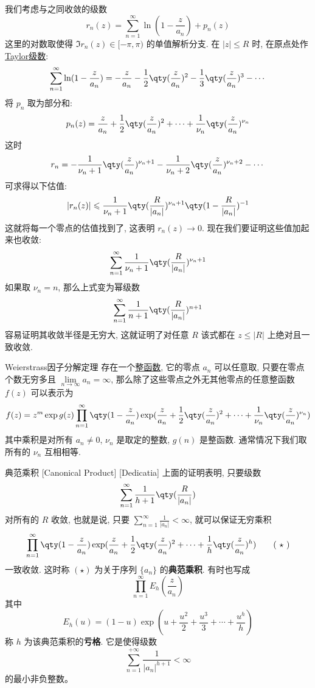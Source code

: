 \documentclass[UTF8]{ctexart}
\begin{document}
        \begin{prf}
            我们考虑与之同收敛的级数
            \[r_n(z)=\sum_{n=1}^{\infty}\ln(1-\frac{z}{a_n})+p_n(z)\]
            这里的对数取使得 \(\Im r_n(z)\in[-\pi,\pi)\) 的单值解析分支. 在 \(|z|\leqslant R\) 时, 在原点处作\hyperref[thm:TaylorSeries]{Taylor级数}:
            \[\sum_{n=1}^{\infty}\ln(1-\frac{z}{a_n})=-\frac{z}{a_n}-\frac{1}{2}\qty(\frac{z}{a_n})^2-\frac{1}{3}\qty(\frac{z}{a_n})^3-\cdots\]
            将 \(p_n\) 取为部分和: 
            \[p_n(z)=\frac{z}{a_n}+\frac{1}{2}\qty(\frac{z}{a_n})^2+\cdots+\frac{1}{\nu_n}\qty(\frac{z}{a_n})^{\nu_n}\]
            这时
            \[r_n=-\frac{1}{\nu_n+1}\qty(\frac{z}{a_n})^{\nu_n+1}-\frac{1}{\nu_n+2}\qty(\frac{z}{a_n})^{\nu_n+2}-\cdots\]
            可求得以下估值: 
            \[|r_n(z)|\leqslant\frac{1}{\nu_n+1}\qty(\frac{R}{|a_n|})^{\nu_n+1}\qty(1-\frac{R}{|a_n|})^{-1} \]
            这就将每一个零点的估值找到了, 这表明 \(r_n(z)\to 0\). 现在我们要证明这些值加起来也收敛: 
            \[\sum_{n=1}^{\infty}\frac{1}{\nu_n+1}\qty(\frac{R}{|a_n|})^{\nu_n+1}\]
            如果取 \(\nu_n=n\), 那么上式变为幂级数
            \[\sum_{n=1}^{\infty}\frac{1}{n+1}\qty(\frac{R}{|a_n|})^{n+1}\]
            容易证明其收敛半径是无穷大, 这就证明了对任意 \(R\) 该式都在 \(z\leq|R|\) 上绝对且一致收敛. 
        \end{prf}

        \begin{thm}
            {Weierstrass因子分解定理}
            存在一个\hyperref[dfn:EntireFunction]{整函数}, 它的零点 \(a_n\) 可以任意取, 只要在零点个数无穷多且 \(\lim\limits_{n\to\infty }a_n=\infty\), 那么除了这些零点之外无其他零点的任意整函数 \(f(z)\) 可以表示为
            \[f(z)=z^m\exp g(z)\prod_{n=1}^{\infty}\qty(1-\frac{z}{a_n})\exp(\frac{z}{a_n}+\frac{1}{2}\qty(\frac{z}{a_n})^2+\cdots+\frac{1}{\nu_n}\qty(\frac{z}{a_n})^{\nu_n})\]
            其中乘积是对所有 \(a_n\neq 0\),  \(\nu_n\) 是取定的整数,  \(g(n)\) 是整函数. 通常情况下我们取所有的 \(\nu_n\) 互相相等. 
        \end{thm}

        \begin{dfn}
            [CanonicalProduct]
            {典范乘积}
            [Canonical Product]
            [Dedicatia]
            上面的证明表明, 只要级数
            \[\sum_{n=1}^{\infty}\frac{1}{h+1}\qty(\frac{R}{|a_n|})\]
            对所有的 \(R\) 收敛, 也就是说, 只要 \(\sum\limits_{n=1}^{\infty}\frac{1}{|a_n|}<\infty\), 就可以保证无穷乘积
            \[\prod_{n=1}^{\infty}\qty(1-\frac{z}{a_n})\exp(\frac{z}{a_n}+\frac{1}{2}\qty(\frac{z}{a_n})^2+\cdots+\frac{1}{h}\qty(\frac{z}{a_n})^{h})\tag{ \(\star\) }\]
            一致收敛. 这时称 \((\star)\) 为关于序列 \(\{a_n\}\) 的\textbf{典范乘积}. 有时也写成
            \[\prod_{n=1}^{\infty}E_h(\frac{z}{a_n})\]
            其中
            \[E_h(u)=(1-u)\exp(u+\frac{u^2}{2}+\frac{u^3}{3}+\cdots+\frac{u^h}{h})\]
            称 \(h\) 为该典范乘积的\textbf{亏格}. 它是使得级数
            \[\sum_{n=1}^{+\infty}\frac{1}{|a_n|^{h+1}}<\infty\]
            的最小非负整数。
        \end{dfn}
\end{document}
